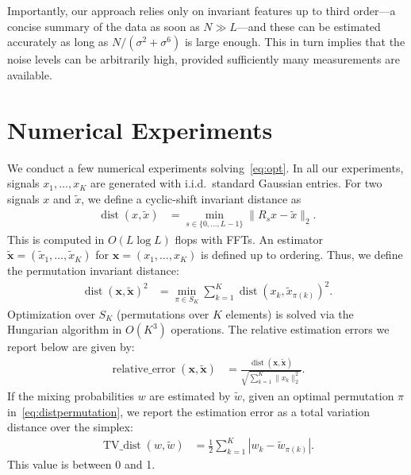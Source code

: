 \documentclass[english]{article}
\numberwithin{equation}{section}
\numberwithin{figure}{section}
\theoremstyle{plain}
\theoremstyle{definition}
\theoremstyle{remark}
\theoremstyle{plain}
\theoremstyle{remark}
\theoremstyle{plain}
\theoremstyle{plain}
\newcommand{\calO}{O}
\newcommand{\dist}{\operatorname{dist}}
\begin{document}
Importantly, our approach relies only on invariant features up to third order---a concise summary of the data as soon as $N \gg L$---and these can be estimated accurately as long as $N /(\sigma^2 + \sigma^6)$ is large enough. 
This in turn implies that the noise levels can be arbitrarily high, provided sufficiently many measurements are available.
 







\section{Numerical Experiments}\label{sec:numerical}

We conduct a few numerical experiments solving~\eqref{eq:opt}. In all our experiments, signals $x_1, \ldots, x_K$ are generated with i.i.d.\ standard Gaussian entries.
For two signals $x$ and $\tilde x$, we define a cyclic-shift invariant distance as
\begin{align}
	\dist(x, \tilde x) & = \min_{s \in \{0, \ldots, L-1\}} \| R_s x - \tilde x \|_2.
\end{align}
This is computed in $\calO(L\log L)$ flops with FFTs. An estimator $\mathbf{\tilde x} = (\tilde x_1, \ldots, \tilde x_K)$ for $\mathbf{x} = (x_1, \ldots, x_K)$ is defined up to ordering. Thus, we define the permutation invariant distance:
\begin{align}
	\dist(\mathbf{x}, \mathbf{\tilde x})^2 & = \min_{\pi \in S_K} \sum_{k = 1}^K \dist(x_k, \tilde x_{\pi(k)})^2.
	\label{eq:distpermutation}
\end{align}
Optimization over $S_K$ (permutations over $K$ elements) is  solved via the Hungarian algorithm in $\calO(K^3)$ operations.
The relative estimation errors we report below are given by:
\begin{align}
	\operatorname{relative\_error}(\mathbf{x}, \mathbf{\tilde x}) & = \frac{\dist(\mathbf{x}, \mathbf{\tilde x})}{\sqrt{\sum_{k = 1}^K \|x_k\|_2^2}}.
	\label{eq:metric}
\end{align}
If the mixing probabilities $w$ are estimated by $\tilde w$, given an optimal permutation $\pi$ in~\eqref{eq:distpermutation}, we report the estimation error as a total variation distance over the simplex:
\begin{align}
	\operatorname{TV\_dist}(w, \tilde w) & = \frac{1}{2} \sum_{k = 1}^K |w_k - \tilde w_{\pi(k)}|.
\end{align}
This value is between 0 and 1.
\end{document}
